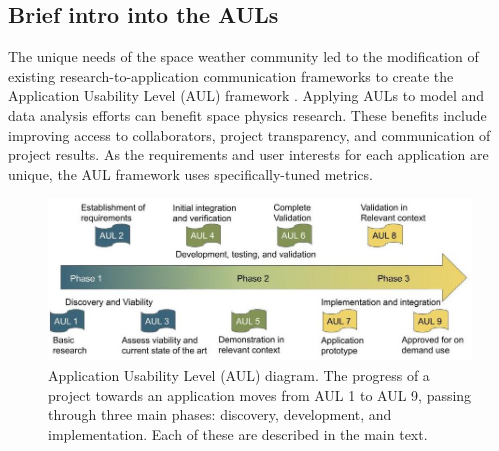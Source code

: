 \documentclass[referee,a4paper,12pt,traditabstract]{swsc}
\begin{document}
\begin{linenumbers}
\subsection{Brief intro into the AULs}

The unique needs of the space weather community led to the modification of existing research-to-application communication frameworks to create the Application Usability Level (AUL) framework \citep{halford19}. Applying AULs to model and data analysis efforts can benefit space physics research. These benefits include improving access to collaborators, project transparency, and communication of project results. As the requirements and user interests for each application are unique, the AUL framework uses specifically-tuned metrics. 
   
   
   
\begin{figure}
\centering\includegraphics[width=0.9\linewidth]{Fig_AUL.jpg}
\caption{Application Usability Level (AUL) diagram. The progress of a project towards an application moves from AUL 1 to AUL 9, passing through three main phases: discovery, development, and implementation. Each of these are described in the main text. }\label{Fig_AUL}

\end{figure}




\end{linenumbers}
\end{document}
